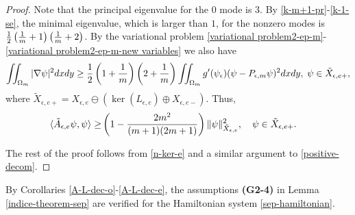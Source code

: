 \documentclass[1 [leqno, 11pt]{amsart}
\numberwithin{equation}{section}
\let\ep=\epsilon
\begin{document}
\begin{CJK*}{GBK}{song}
\begin{proof}
Note that the principal  eigenvalue  for the $0$ mode is $3$. By \eqref{k-m+1-pr}-\eqref{k-1-se},  the minimal  eigenvalue, which is larger than $1$,  for the nonzero modes is ${1\over2}\left({1\over m}+1\right)\left({1\over m}+2 \right)$. By the variational problem \eqref{variational problem2-ep-m}-\eqref{variational problem2-ep-m-new variables} we also have
\begin{align*}
\iint_{\Omega_m}|\nabla\psi|^2dxdy\geq{1\over2}\left(1+{1\over m}\right)\left(2+{1\over m}\right)\iint_{\Omega_m}g'(\psi_\ep)(\psi-P_{\ep,m}\psi)^2dxdy,\;\psi\in\tilde X_{\ep,e+},
\end{align*}
where $\tilde X_{\ep,e+}=X_{\ep,e} \ominus\left(\ker (L_{\ep,e})\oplus X_{\ep,e-}\right)$.
Thus,
\begin{align*}
 \langle\tilde A_{\ep,e}\psi,\psi\rangle
 \geq& \left(1-{2m^2\over (m+1)(2m+1)}\right) \| \psi\|_{\tilde X_{\ep,e}}^2,\quad \psi\in\tilde X_{\ep,e+}.
\end{align*}

The rest of the proof follows from \eqref{n-ker-e} and a similar argument to \eqref{positive-decom}.
\end{proof}




By Corollaries \ref{A-L-dec-o}-\ref{A-L-dec-e}, the assumptions \textbf{(G2-4)} in Lemma \ref{indice-theorem-sep} are verified for the Hamiltonian system
\eqref{sep-hamiltonian}.


\end{CJK*}
\end{document}
